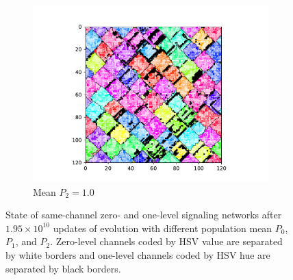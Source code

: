 \begin{figure}[t]
\begin{center}
\begin{subfigure}[b]{0.82\columnwidth}
  \includegraphics[width=\columnwidth,trim={2.5cm 0.5cm 2.5cm 1cm},clip]{img/ChannelMap_1008_update19500000}
  \caption{Mean $P_2 = 1.0$}
  \label{fig:ChannelMap_1008}
\end{subfigure}

\caption{
State of same-channel zero- and one-level signaling networks after $1.95 \times 10^{10}$ updates of evolution with different population mean $P_0$, $P_1$, and $P_2$.
Zero-level channels coded by HSV value are separated by white borders and one-level channels coded by HSV hue are separated by black borders.
}
\label{fig:outcome_grids}
\end{center}
\end{figure}
